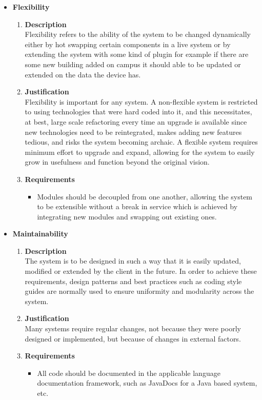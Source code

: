 \documentclass[a4paper,10pt]{article}
\begin{document}
\begin{itemize}
\item \textbf {Flexibility}
\begin{enumerate}
\item \textbf{Description} \\
Flexibility refers to the ability of the system to be changed dynamically either by hot swapping certain components in a live system or by extending the system with some kind of plugin for example if there are some new building added on campus it should able to be updated or extended on the data the device has. 
\item \textbf{Justification} \\
Flexibility is important for any system. A non-flexible system is restricted to using technologies that were hard coded into it, and this necessitates, at best, large scale refactoring every time an upgrade is available since new technologies need to be reintegrated, makes adding new features tedious, and risks the system becoming archaic. A flexible system requires minimum effort to upgrade and expand, allowing for the system to easily grow in usefulness and function beyond the original vision.
\item \textbf{Requirements}
	\begin{itemize}
	\item Modules should be decoupled from one another, allowing the system to be extensible without a break in service which is achieved by integrating new modules and swapping out existing ones. 
	\end{itemize}
\end{enumerate}
\item \textbf {Maintainability}
\begin{enumerate}
\item \textbf{Description} \\
The system is to be designed in such a way that it is easily updated, modified or extended by the client in the future. In order to achieve these requirements, design patterns and best practices such as coding style guides are normally used to ensure uniformity and modularity across the system.
\item \textbf{Justification} \\
Many systems require regular changes, not because they were poorly designed or implemented, but because of changes in external factors.
\item \textbf{Requirements}
	\begin{itemize}
		\item All code should be documented in the applicable language documentation framework, such as JavaDocs for a Java based system, etc.

\end{itemize}
\end{enumerate}
\end{itemize}
\end{document}
